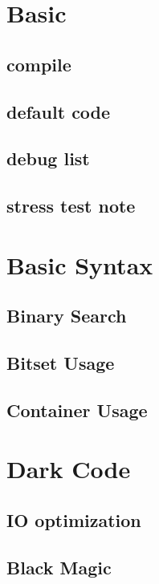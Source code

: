 \section{Basic}

\subsection{compile}

\subsection{default code}

\subsection{debug list}

\subsection{stress test note}


\section{Basic Syntax}
\subsection{Binary Search}

\subsection{Bitset Usage}

\subsection{Container Usage}



\section{Dark Code}

\subsection{IO optimization}

\subsection{Black Magic}



